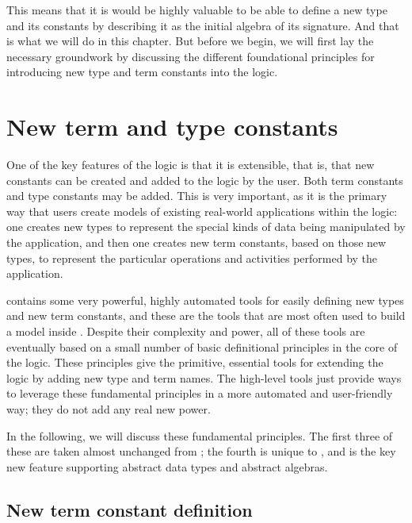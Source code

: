 This means that it is would be highly valuable to be able to define a new type
and its constants by describing it as the initial algebra of its signature.
And that is what we will do in this chapter. But before we begin, we will first
lay the necessary groundwork by discussing
the different foundational principles for introducing new type and term
constants into the \HOLW{} logic.


\section{New term and type constants}

One of the key features of the \HOLW{} logic is that it is extensible, that is,
that new constants can be created and added to the logic by the user. Both term
constants and type constants may be added.  This is very important, as it is
the primary way that users create models of existing real-world applications
within the logic: one creates new types to represent the special kinds of data
being manipulated by the application, and then one creates new term constants,
based on those new types, to represent the particular operations and activities
performed by the application.

\HOLW{} contains some very powerful, highly automated tools for easily defining
new types and new term constants, and these are the tools that are most often
used to build a model inside \HOLW. Despite their complexity and power, all of
these tools are eventually based on a small number of basic definitional
principles in the core of the logic. These principles give the primitive,
essential tools for extending the logic by adding new type and term names.
The high-level tools just provide ways to leverage these fundamental principles
in a more automated and user-friendly way; they do not add any real new power.

In the following, we will discuss these fundamental principles.
The first three of these are taken almost unchanged from \HOL{}; the fourth
is unique to \HOLW{}, and is the key new feature supporting abstract data types
and abstract algebras.

\subsection{New term constant definition}

